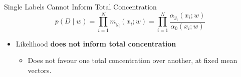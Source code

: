 \begin{frame}{Single Labels Cannot Inform Total Concentration}
\label{frm:likelihood-limit}
\setlength{\abovedisplayskip}{2pt}
\setlength{\belowdisplayskip}{2pt}
\setlength{\itemsep}{5mm}
\[
p(D\mid w)=\prod_{i=1}^{N}m_{y_i}(x_i;w)=\prod_{i=1}^{N}\frac{\alpha_{y_i}(x_i;w)}{\alpha_0(x_i;w)}
\]
\begin{itemize}
\item Likelihood \textbf{does not inform total concentration} 
\begin{itemize}
\item Does not favour one total concentration over another,
at fixed mean vectors.
\end{itemize}
\end{itemize}


\end{frame}
